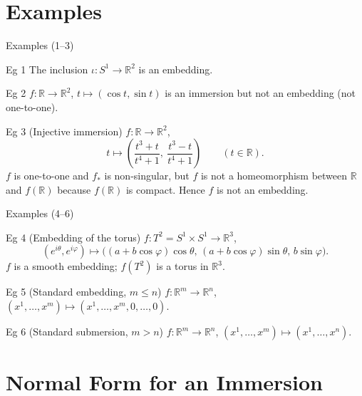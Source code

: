 \documentclass[10pt]{beamer}
\newcommand{\R}{\mathbb{R}}
\begin{document}
\section{Examples}

\begin{frame}{Examples (1--3)}
	\begin{exampleblock}{Eg 1}
		The inclusion $\iota : S^1 \longrightarrow \R^2$ is an
		embedding.
	\end{exampleblock}
	\begin{exampleblock}{Eg 2}
		$f : \R \to \R^2$, $t \longmapsto (\cos t, \sin t)$ is an
		immersion but not an embedding (not one-to-one).
	\end{exampleblock}
	\begin{exampleblock}{Eg 3 (Injective immersion)}
		$f : \R \to \R^2$,
		\[
			t \longmapsto
			\left( \frac{t^3 + t}{t^4 + 1},\ \frac{t^3 - t}{t^4 + 1}
			\right) \qquad (t \in \R).
		\]
		$f$ is one-to-one and $f_*$ is non-singular, but $f$ is not a
		homeomorphism between $\R$ and $f(\R)$ because $f(\R)$ is
		compact. Hence $f$ is not an embedding.
	\end{exampleblock}
\end{frame}

\begin{frame}{Examples (4--6)}
	\begin{exampleblock}{Eg 4 (Embedding of the torus)}
		$f : T^2 = S^1 \times S^1 \to \R^3$,
		\[
			(e^{i\theta}, e^{i\varphi}) \longmapsto
			\bigl( (a + b\cos\varphi)\cos\theta,\,
			(a + b\cos\varphi)\sin\theta,\, b\sin\varphi \bigr).
		\]
		$f$ is a smooth embedding; $f(T^2)$ is a torus in $\R^3$.
	\end{exampleblock}
	\begin{exampleblock}{Eg 5 (Standard embedding, $m \le n$)}
		$f : \R^m \to \R^n$,\quad
		$(x^1, \dots, x^m) \longmapsto (x^1, \dots, x^m, 0, \dots, 0)$.
	\end{exampleblock}
	\begin{exampleblock}{Eg 6 (Standard submersion, $m > n$)}
		$f : \R^m \to \R^n$,\quad
		$(x^1, \dots, x^m) \longmapsto (x^1, \dots, x^n)$.
	\end{exampleblock}
\end{frame}

\section{Normal Form for an Immersion}
\end{document}
